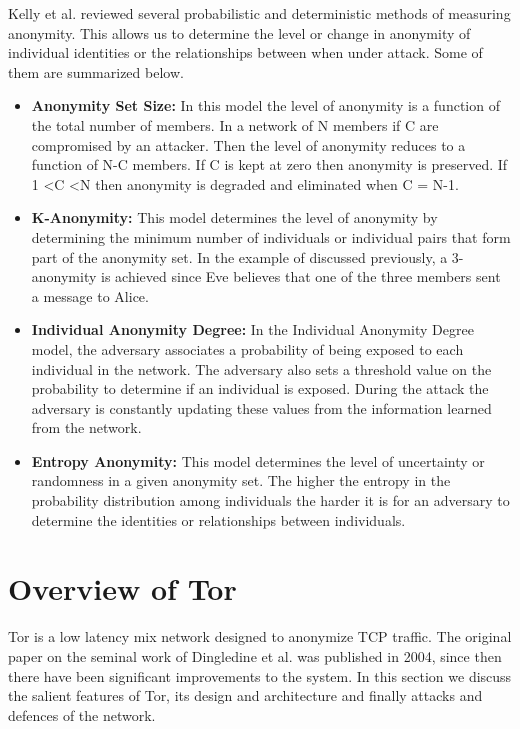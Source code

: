 \documentclass{llncs}
\begin{document}
Kelly et al. \cite{kelly2012exploring} reviewed several probabilistic and deterministic methods of measuring anonymity. This allows us to determine the level or change in anonymity of individual identities or the relationships between when under attack. Some of them are summarized below. 
\begin{itemize}
	\item[]{\textbf{Anonymity Set Size:} In this model the level of anonymity is a function of the total number of members. In a network of N members if C are compromised by an attacker. Then the level of anonymity reduces to a function of N-C members. If C is kept at zero then anonymity is preserved. If 1 \textless C \textless N then anonymity is degraded and eliminated when C = N-1.}
	\item[]{\textbf{K-Anonymity:} This model determines the level of anonymity by determining the minimum number of individuals or individual pairs that form part of the anonymity set. In the example of discussed previously, a 3-anonymity is achieved since Eve believes that one of the three members sent a message to Alice.}
	\item[]{\textbf{Individual Anonymity Degree:} In the Individual Anonymity Degree model, the adversary associates a probability of being exposed to each individual in the network. The adversary also sets a threshold value on the probability to determine if an individual is exposed. During the attack the adversary is constantly updating these values from the information learned from the network.}
	\item[]{\textbf{Entropy Anonymity:} This model determines the level of uncertainty or randomness in a given anonymity set. The higher the entropy in the probability distribution among individuals the harder it is for an adversary to determine the identities or relationships between individuals.}
\end{itemize}

\section{Overview of Tor} \label{tor}
Tor is a low latency mix network designed to anonymize TCP traffic. The original paper on the seminal work of Dingledine et al. \cite{tor-design} was published in 2004, since then there have been significant improvements to the system. In this section we discuss the salient features of Tor, its design and architecture and finally attacks and defences of the network. 
\end{document}
